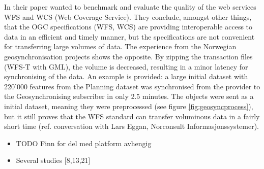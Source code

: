 
In their paper \cite{giuliani2013} wanted to benchmark and evaluate the quality of the web services WFS and WCS (Web Coverage Service). They conclude, amongst other things, that the OGC specifications (WFS, WCS) are providing interoperable access to data in an efficient and timely manner, but the specifications are not convenient for transferring large volumes of data.  The experience from the Norwegian geosynchronisation projects shows the opposite. By zipping the transaction files (WFS-T with GML), the volume is decreased, resulting in a minor latency for synchronising of the data. An example is provided: a large initial dataset with 220'000 features from the Planning dataset was synchronised from the provider to the Geosynchronising subscriber in only 2.5 minutes. The objects were sent as a initial dataset, meaning they were preprocessed  (see figure \ref{fig:geosyncprocess}), but it still proves that the WFS standard can transfer voluminous data in a fairly short time (ref. conversation with Lars Eggan, Norconsult Informasjonssystemer).

\cite{giuliani2013}



\begin{itemize}
	\item TODO Finn for del med platform avhengig
	\item Several studies [8,13,21] \cite{giuliani2013} \cite{Zhao2012}
\end{itemize}







